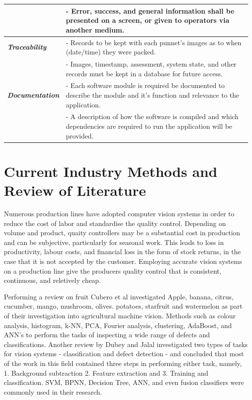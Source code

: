 \documentclass[fleqn,twoside]{article}
\begin{document}
\begin{longtable}{p{2.5cm}p{12cm}}
	& - Error, success, and general information shall be presented on a screen, or given to operators via another medium.  \\[2pt]
	\hline
	\textbf{\textit{Traceability}}		& - Records to be kept with each punnet's images as to when (date/time) they were packed.  \\[4pt]
	& - Images, timestamp, assessment, system state, and other records must be kept in a database for future access. \\[2pt]
	\hline
	\textbf{\textit{Documentation}}	& - Each software module is required be documented to describe the module and it's function and relevance to the application.  \\[4pt]
	& - A description of how the software is compiled and which dependencies are required to run the application will be provided. \\[2pt]
	\hline
\end{longtable}








\newpage

\section{Current Industry Methods and Review of Literature}
\label{sec:lit}

Numerous production lines have adopted computer vision systems in order to reduce the cost of labor and standardise the quality control. Depending on volume and product, quaity controllers may be a substantial cost in production and can be subjective, particularly for seasonal work. This leads to loss in productivity, labour costs, and financial loss in the form of stock returns, in the case that it is not accepted by the customer. Employing accurate vision systems on a production line give the producers quality control that is consistent, continuous, and reletively cheap. 

Performing a review on fruit Cubero et al \cite{cubero} investigated Apple, banana, citrus, cucumber, mango, mushroom, olives. potatoes, starfruit and watermelon as part of their investigation into agricultural machine vision. Methods such as colour analysis, histogram, k-NN, PCA, Fourier analysis, clustering, AdaBoost, and ANN's to perform the tasks of inspecting a wide range of defects and classifications. Another review by Dubey and Jalal \cite{dubey} investigated two types of tasks for vision systems - classification and defect detection - and concluded that most of the work in this field contained three steps in performing either task, namely, 1. Background subtraction 2. Feature extraction and 3. Training and classification. SVM, BPNN, Decision Tree, ANN, and even fusion classifiers were commonly used in their research.
\end{document}
